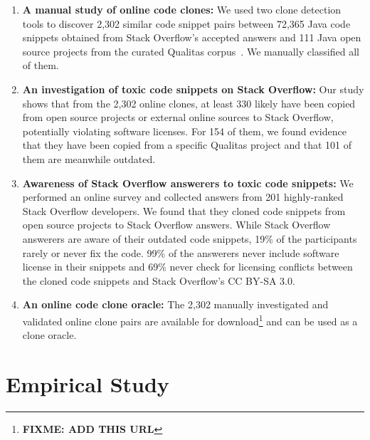 \documentclass[10pt,journal,compsoc]{IEEEtran}
\newcommand\FIXME[1]{{\color{red}\textbf{FIXME: #1}}}
\begin{document}
\begin{enumerate} 
	\item \textbf{A manual study of online code clones:} We used
	two clone detection tools to discover 2,302 similar code snippet pairs between
	72,365 Java code snippets obtained from Stack Overflow's accepted answers and
	111 Java open source projects from the curated Qualitas
	corpus~\cite{QualitasCorpus}. We manually
	classified all of them.
	
	\item \textbf{An investigation of toxic code snippets on Stack Overflow:} Our study shows that from
	the 2,302 online clones, at least 330 likely have been copied from open source
	projects or external online sources to Stack Overflow, potentially violating
	software licenses. For 154 of them, we found evidence that they have been copied
	from a specific Qualitas project and that 101 of them are meanwhile outdated. %
	
	\item \textbf{Awareness of Stack Overflow answerers to toxic code snippets:} We
	performed an online survey and collected answers from 201 highly-ranked Stack
	Overflow developers. We found that they cloned code snippets from open source
	projects to Stack Overflow answers. While Stack Overflow answerers are aware of
	their outdated code snippets, 19\% of the participants rarely
	or never fix the code. 99\% of the answerers never include software
	license in their snippets and 69\% never check for licensing conflicts between the
	cloned code snippets and Stack Overflow's CC BY-SA 3.0.
	
	\item \textbf{An online code
		clone oracle:} The 2,302 manually investigated and validated online clone pairs
	are available for download\footnote{\FIXME{ADD THIS URL}} and
	can be used as a clone oracle. \end{enumerate}

\section{Empirical Study}
\end{document}
